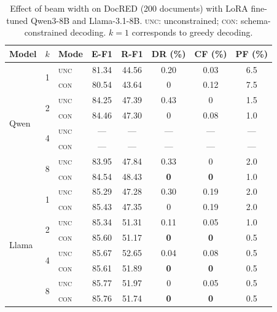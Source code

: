 \begin{table}[t]
\centering
\small
\caption{Effect of beam width on DocRED (200 documents) with LoRA fine-tuned Qwen3-8B and Llama-3.1-8B. \textsc{unc}: unconstrained; \textsc{con}: schema-constrained decoding. $k{=}1$ corresponds to greedy decoding.}
\label{tab:beam-docred-sweep}
\begin{tabular}{@{}l cl ccccc@{}}
\toprule
Model & $k$ & Mode & E-F1 & R-F1 & DR (\%) & CF (\%) & PF (\%) \\
\midrule
\multirow{8}{*}{Qwen}
 & \multirow{2}{*}{1} & \textsc{unc} & 81.34 & 44.56 & 0.20 & 0.03 & 6.5 \\
 &                     & \textsc{con} & 80.54 & 43.64 & 0    & 0.12 & 7.5 \\
\cmidrule(l){2-8}
 & \multirow{2}{*}{2} & \textsc{unc} & 84.25 & 47.39 & 0.43 & 0    & 1.5 \\
 &                     & \textsc{con} & 84.46 & 47.30 & 0    & 0.08 & 1.0 \\
\cmidrule(l){2-8}
 & \multirow{2}{*}{4} & \textsc{unc} & ---   & ---   & ---  & ---  & --- \\
 &                     & \textsc{con} & ---   & ---   & ---  & ---  & --- \\
\cmidrule(l){2-8}
 & \multirow{2}{*}{8} & \textsc{unc} & 83.95 & 47.84 & 0.33 & 0    & 2.0 \\
 &                     & \textsc{con} & 84.54 & 48.43 & \textbf{0} & \textbf{0} & 1.0 \\
\midrule
\multirow{8}{*}{Llama}
 & \multirow{2}{*}{1} & \textsc{unc} & 85.29 & 47.28 & 0.30 & 0.19 & 2.0 \\
 &                     & \textsc{con} & 85.43 & 47.35 & 0    & 0.19 & 2.0 \\
\cmidrule(l){2-8}
 & \multirow{2}{*}{2} & \textsc{unc} & 85.34 & 51.31 & 0.11 & 0.05 & 1.0 \\
 &                     & \cellcolor{blue!8}\textsc{con} & \cellcolor{blue!8}85.60 & \cellcolor{blue!8}51.17 & \cellcolor{blue!8}\textbf{0} & \cellcolor{blue!8}\textbf{0} & \cellcolor{blue!8}0.5 \\
\cmidrule(l){2-8}
 & \multirow{2}{*}{4} & \textsc{unc} & 85.67 & 52.65 & 0.04 & 0.08 & 0.5 \\
 &                     & \textsc{con} & 85.61 & 51.89 & \textbf{0} & \textbf{0} & 0.5 \\
\cmidrule(l){2-8}
 & \multirow{2}{*}{8} & \textsc{unc} & 85.77 & 51.97 & 0    & 0.05 & 0.5 \\
 &                     & \textsc{con} & 85.76 & 51.74 & \textbf{0} & \textbf{0} & 0.5 \\
\bottomrule
\end{tabular}
\end{table}
